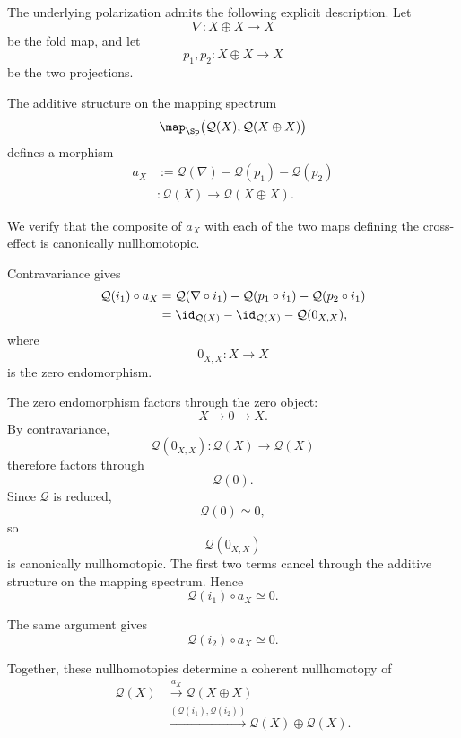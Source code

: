 \begin{definition}
The underlying polarization admits the following explicit description.
Let
\[
    \nabla
    \colon
    X\oplus X
    \longrightarrow
    X
\]
be the fold map, and let
\[
    p_1,p_2
    \colon
    X\oplus X
    \longrightarrow
    X
\]
be the two projections.

The additive structure on the mapping spectrum
\[
    \map_{\Sp}
    \bigl(
        \mathcal Q(X),
        \mathcal Q(X\oplus X)
    \bigr)
\]
defines a morphism
\[
\begin{aligned}
    a_X
    &:=
    \mathcal Q(\nabla)
    -
    \mathcal Q(p_1)
    -
    \mathcal Q(p_2)
    \\
    &\colon
    \mathcal Q(X)
    \longrightarrow
    \mathcal Q(X\oplus X).
\end{aligned}
\]

We verify that the composite of $a_X$ with each of the two maps defining
the cross-effect is canonically nullhomotopic.

Contravariance gives
\[
\begin{aligned}
    \mathcal Q(i_1)\circ a_X
    &=
    \mathcal Q(\nabla\circ i_1)
    -
    \mathcal Q(p_1\circ i_1)
    -
    \mathcal Q(p_2\circ i_1)
    \\
    &=
    \id_{\mathcal Q(X)}
    -
    \id_{\mathcal Q(X)}
    -
    \mathcal Q(0_{X,X}),
\end{aligned}
\]
where
\[
    0_{X,X}
    \colon
    X
    \longrightarrow
    X
\]
is the zero endomorphism.

The zero endomorphism factors through the zero object:
\[
    X
    \longrightarrow
    0
    \longrightarrow
    X.
\]
By contravariance,
\[
    \mathcal Q(0_{X,X})
    \colon
    \mathcal Q(X)
    \longrightarrow
    \mathcal Q(X)
\]
therefore factors through
\[
    \mathcal Q(0).
\]
Since $\mathcal Q$ is reduced,
\[
    \mathcal Q(0)
    \simeq
    0,
\]
so
\[
    \mathcal Q(0_{X,X})
\]
is canonically nullhomotopic. The first two terms cancel through the
additive structure on the mapping spectrum. Hence
\[
    \mathcal Q(i_1)\circ a_X
    \simeq
    0.
\]

The same argument gives
\[
    \mathcal Q(i_2)\circ a_X
    \simeq
    0.
\]

Together, these nullhomotopies determine a coherent nullhomotopy of
\[
\begin{aligned}
    \mathcal Q(X)
    &\xrightarrow{a_X}
    \mathcal Q(X\oplus X)
    \\
    &\xrightarrow{
        (\mathcal Q(i_1),\mathcal Q(i_2))
    }
    \mathcal Q(X)\oplus\mathcal Q(X).
\end{aligned}
\]


\end{definition}
